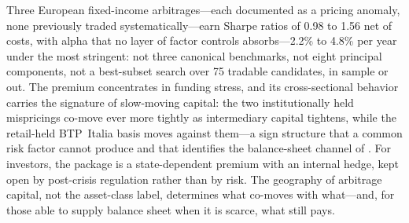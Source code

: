 
Three European fixed-income arbitrages---each documented as a pricing anomaly,
none previously traded systematically---earn Sharpe ratios of 0.98 to 1.56 net
of costs, with alpha that no layer of factor controls absorbs---2.2\% to
4.8\% per year under the most stringent: not three canonical benchmarks, not eight principal
components, not a best-subset search over 75 tradable candidates, in sample or
out. The premium concentrates in funding stress, and its cross-sectional
behavior carries the signature of slow-moving capital: the two institutionally
held mispricings co-move ever more tightly as intermediary capital tightens,
while the retail-held BTP~Italia basis moves against them---a sign structure
that a common risk factor cannot produce and that identifies the balance-sheet
channel of \citet{duffie2010presidential}. For investors, the package is a
state-dependent premium with an internal hedge, kept open by post-crisis
regulation rather than by risk. The geography of arbitrage capital, not the
asset-class label, determines what co-moves with what---and, for those able to
supply balance sheet when it is scarce, what still pays.
